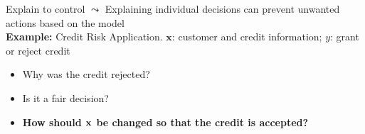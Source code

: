 \documentclass[11pt,compress,t,notes=noshow, aspectratio=169, xcolor=table]{beamer}
\begin{document}
\begin{frame}{Explain to control}
    $\leadsto$ Explaining individual decisions can prevent unwanted actions based on the model \\
    \medskip
    \textbf{Example:} Credit Risk Application. $\textbf{x}$: customer and credit information; $y$: grant or reject credit
	
	\begin{itemize}
		\item Why was the credit rejected?
		\item Is it a fair decision?
		\item \textbf{How should $\xv$ be changed so that the credit is accepted?}
	\end{itemize}
	
\end{frame}

\end{document}
